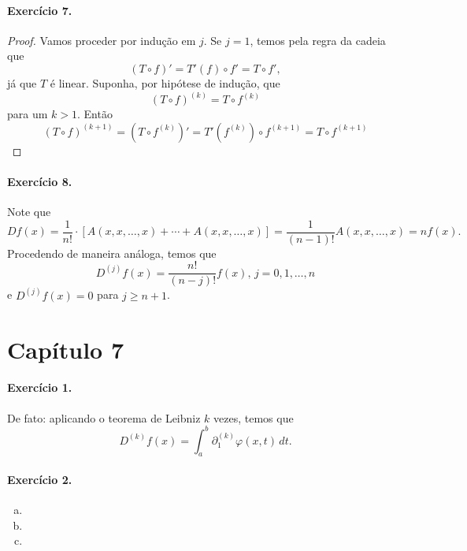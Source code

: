 \documentclass[12pt,a4paper]{article}
\begin{document}
\paragraph{Exercício 7.}
%
\begin{proof}
    Vamos proceder por indução em $j$. Se $j=1$, temos pela regra da cadeia que
    \begin{equation*}
        (T\circ f)' = T'(f)\circ f' = T\circ f',
    \end{equation*}
    já que $T$ é linear. Suponha, por hipótese de indução, que
    \begin{equation*}
        (T\circ f)^{(k)} = T\circ f^{(k)}
    \end{equation*}
    para um $k>1$. Então
    \begin{equation*}
        (T\circ f)^{(k+1)} = (T\circ f^{(k)})' = T'(f^{(k)})\circ f^{(k+1)} = T\circ f^{(k+1)}
    \end{equation*}
\end{proof}
%
\paragraph{Exercício 8.}
%
Note que
%
\begin{equation*}
    Df(x) = \frac{1}{n!} \cdot \left[ A(x, x, \dots, x) 
                                    + \cdots 
                                    + A(x, x, \dots, x) \right]
          = \frac{1}{(n - 1)!}A(x, x, \dots, x)
          = n f(x).
\end{equation*}
%
Procedendo de maneira análoga, temos que
%
\begin{equation*}
    D^{(j)}f(x) = \frac{n!}{(n-j)!}f(x), \, j = 0, 1, \dots, n
\end{equation*}
%
e $D^{(j)}f(x) = 0$ para $j \geq n + 1$.
%
\section*{Capítulo 7}

\paragraph{Exercício 1.} 
%
De fato: aplicando o teorema de Leibniz $k$ vezes, temos que
%
\begin{equation*}
    D^{(k)}f(x) = \int_a^b \partial_1^{(k)} \varphi(x, t) \, dt.
\end{equation*}
%
%
\paragraph{Exercício 2.}
%
\begin{enumerate}[a)]
    \item 
    \item
    \item 
\end{enumerate}
%
\end{document}
